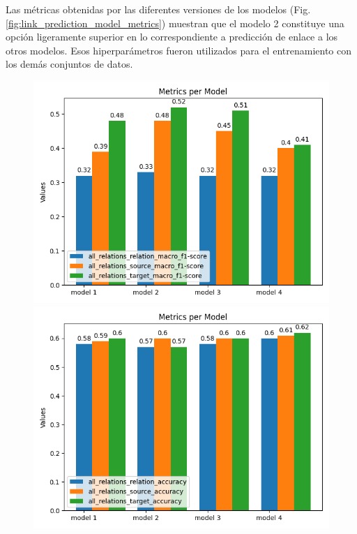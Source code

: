 Las métricas obtenidas por las diferentes versiones de los modelos 
(Fig. \ref{fig:link_prediction_model_metrics}) 
muestran que el modelo 2 constituye una opción ligeramente superior en lo correspondiente a 
predicción de enlace a los otros modelos. Esos hiperparámetros
fueron utilizados para el entrenamiento con los demás conjuntos de datos.

\begin{figure}[h!]
	\begin{center}
		\includegraphics[scale=.4]{Graphics/persuasive_essays_all_linked_all_relation_f1_scores.png}
		\includegraphics[scale=.4]{Graphics/persuasive_essays_all_linked_all_relation_accuracy.png}
	\end{center}

\end{figure}
